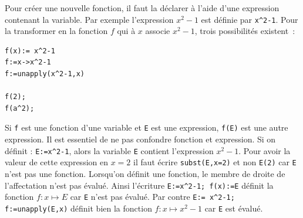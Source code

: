 \documentclass{article}
\begin{document}
Pour cr\'eer une nouvelle fonction, il faut la d\'eclarer \`a l'aide 
d'une expression contenant la variable. 
Par exemple l'expression $x^2-1$ est 
d\'efinie par \verb|x^2-1|. Pour la transformer en la fonction $f$ qui
\`a $x$ associe $x^2-1$, trois possibilit\'es existent~:
\begin{verbatim}
f(x):= x^2-1
f:=x->x^2-1
f:=unapply(x^2-1,x)

f(2); 
f(a^2);
\end{verbatim}
Si \verb|f| est une fonction d'une variable et \verb|E| est une
expression, \verb|f(E)| est une autre expression.
Il est essentiel de ne pas confondre fonction et expression.
Si on d\'efinit : \verb|E:=x^2-1|, alors la variable \verb|E| 
contient l'expression $x^2-1$. Pour avoir la valeur de cette
expression en $x=2$ il faut 
\'ecrire \verb|subst(E,x=2)| et non \verb|E(2)|
car \verb|E| n'est pas une fonction.
Lorsqu'on d\'efinit une fonction,
le membre de droite de l'affectation n'est pas \'evalu\'e.
Ainsi l'\'ecriture \verb|E:=x^2-1; f(x):=E|
d\'efinit la fonction $f: x \mapsto E$ car \verb|E| n'est pas \'evalu\'e.
Par contre \verb|E:= x^2-1; f:=unapply(E,x)| d\'efinit bien la
fonction $f: x\mapsto x^2-1$ car \verb|E| est \'evalu\'e.
\end{document}
